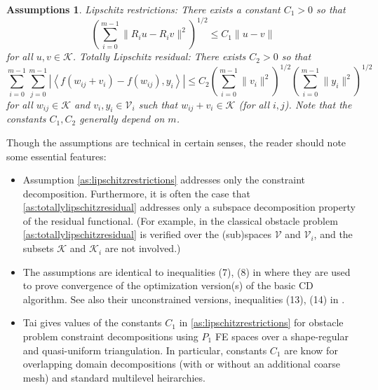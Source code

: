 \documentclass[letterpaper,final,12pt,reqno]{amsart}
\theoremstyle{cstyle}
\theoremstyle{cstyle*}
\newtheorem{assumptions*}{Assumptions}
\theoremstyle{dstyle}
\numberwithin{equation}{section}
\numberwithin{figure}{section}
\numberwithin{table}{section}
\numberwithin{theorem}{section}
\newcommand{\cK}{\mathcal{K}}
\newcommand{\cV}{\mathcal{V}}
\newcommand{\ip}[2]{\left<#1,#2\right>}
\begin{document}
\begin{assumptions*}  \emph{Lipschitz restrictions}: There exists a constant $C_1>0$ so that
\begin{equation}
\left(\sum_{i=0}^{m-1} \|R_i u - R_i v\|^2\right)^{1/2} \le C_1 \|u-v\| \label{as:lipschitzrestrictions}
\end{equation}
for all $u,v\in\cK$.  \emph{Totally Lipschitz residual}: There exists $C_2>0$ so that
\begin{equation}
\sum_{i=0}^{m-1} \sum_{j=0}^{m-1} \left|\ip{f(w_{ij} + v_i) - f(w_{ij})}{y_i}\right| \le C_2 \left(\sum_{i=0}^{m-1} \|v_i\|^2\right)^{1/2} \left(\sum_{i=0}^{m-1} \|y_i\|^2\right)^{1/2} \label{as:totallylipschitzresidual}
\end{equation}
for all $w_{ij} \in \cK$ and $v_i,y_i \in \cV_i$ such that $w_{ij} + v_i \in \cK$ (for all $i,j$).  Note that the constants $C_1,C_2$ generally depend on $m$.
\end{assumptions*}

Though the assumptions are technical in certain senses, the reader should note some essential features:
\begin{itemize}
\item Assumption \eqref{as:lipschitzrestrictions} addresses only the constraint decomposition.  Furthermore, it is often the case that \eqref{as:totallylipschitzresidual} addresses only a subspace decomposition property of the residual functional.  (For example, in the classical obstacle problem \eqref{as:totallylipschitzresidual} is verified over the (sub)spaces $\cV$ and $\cV_i$, and the subsets $\cK$ and $\cK_i$ are not involved.)
\item The assumptions are identical to inequalities (7), (8) in \cite{Tai2003} where they are used to prove convergence of the optimization version(s) of the basic CD algorithm.  See also their unconstrained versions, inequalities (13), (14) in \cite{TaiXu2002}.
\item Tai \cite{Tai2003} gives values of the constants $C_1$ in \eqref{as:lipschitzrestrictions} for obstacle problem constraint decompositions using $P_1$ FE spaces over a shape-regular and quasi-uniform triangulation.  In particular, constants $C_1$ are know for overlapping domain decompositions (with or without an additional coarse mesh) and standard multilevel heirarchies.
\end{itemize}
\end{document}
